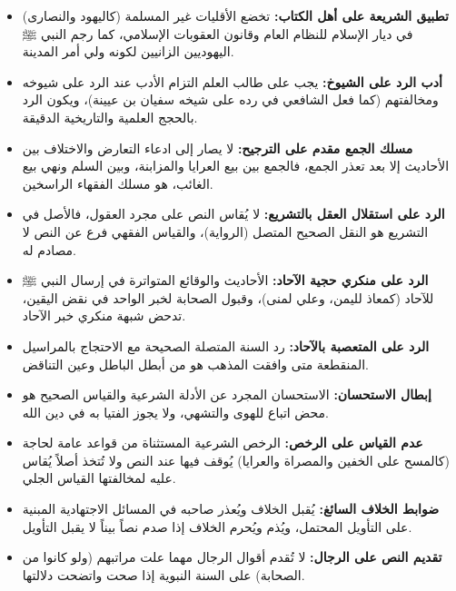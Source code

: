 \begin{itemize}
    \item \textbf{تطبيق الشريعة على أهل الكتاب:} تخضع الأقليات غير المسلمة (كاليهود والنصارى) في ديار الإسلام للنظام العام وقانون العقوبات الإسلامي، كما رجم النبي ﷺ اليهوديين الزانيين لكونه ولي أمر المدينة.
    \item \textbf{أدب الرد على الشيوخ:} يجب على طالب العلم التزام الأدب عند الرد على شيوخه ومخالفتهم (كما فعل الشافعي في رده على شيخه سفيان بن عيينة)، ويكون الرد بالحجج العلمية والتاريخية الدقيقة.
    \item \textbf{مسلك الجمع مقدم على الترجيح:} لا يصار إلى ادعاء التعارض والاختلاف بين الأحاديث إلا بعد تعذر الجمع، فالجمع بين بيع العرايا والمزابنة، وبين السلم ونهي بيع الغائب، هو مسلك الفقهاء الراسخين.
    \item \textbf{الرد على استقلال العقل بالتشريع:} لا يُقاس النص على مجرد العقول، فالأصل في التشريع هو النقل الصحيح المتصل (الرواية)، والقياس الفقهي فرع عن النص لا مصادم له.
    \item \textbf{الرد على منكري حجية الآحاد:} الأحاديث والوقائع المتواترة في إرسال النبي ﷺ للآحاد (كمعاذ لليمن، وعلي لمنى)، وقبول الصحابة لخبر الواحد في نقض اليقين، تدحض شبهة منكري خبر الآحاد.
    \item \textbf{الرد على المتعصبة بالآحاد:} رد السنة المتصلة الصحيحة مع الاحتجاج بالمراسيل المنقطعة متى وافقت المذهب هو من أبطل الباطل وعين التناقض.
    \item \textbf{إبطال الاستحسان:} الاستحسان المجرد عن الأدلة الشرعية والقياس الصحيح هو محض اتباع للهوى والتشهي، ولا يجوز الفتيا به في دين الله.
    \item \textbf{عدم القياس على الرخص:} الرخص الشرعية المستثناة من قواعد عامة لحاجة (كالمسح على الخفين والمصراة والعرايا) يُوقف فيها عند النص ولا تُتخذ أصلاً يُقاس عليه لمخالفتها القياس الجلي.
    \item \textbf{ضوابط الخلاف السائغ:} يُقبل الخلاف ويُعذر صاحبه في المسائل الاجتهادية المبنية على التأويل المحتمل، ويُذم ويُحرم الخلاف إذا صدم نصاً بيناً لا يقبل التأويل.
    \item \textbf{تقديم النص على الرجال:} لا تُقدم أقوال الرجال مهما علت مراتبهم (ولو كانوا من الصحابة) على السنة النبوية إذا صحت واتضحت دلالتها.
\end{itemize}

